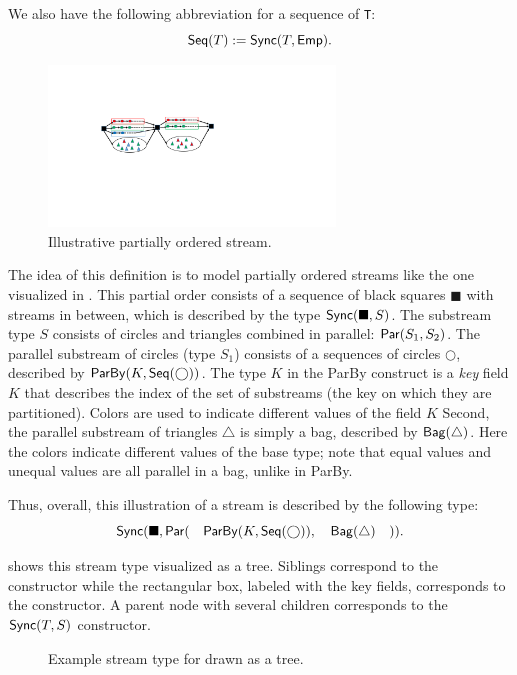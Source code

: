 We also have the following abbreviation for a sequence of \texttt{T}:
\[
  \mathsf{Seq}({T}) := \mathsf{Sync}({T}, \mathsf{Emp}{}).
\]

\begin{figure}
  \centering
  \includegraphics[width=3in]{figures/synchschemas/SPS2.pdf}
  \caption{Illustrative partially ordered stream.}
  \label{fig:ex-postream}
\end{figure}

The idea of this definition is to model partially ordered streams like the one visualized in .
This partial order consists of a sequence of black squares $\blacksquare$ with streams in between, which is described by the type $\mathsf{Sync}({\blacksquare}, S)$.
The substream type $S$ consists of circles and triangles combined in parallel: $\mathsf{Par}({S_1}, {S_2})$.
The parallel substream of circles (type $S_1$) consists of a sequences of circles $\bigcirc$, described by $\mathsf{ParBy}({K}, \mathsf{Seq}({\bigcirc}))$.
The type $K$ in the ParBy construct is a \emph{key} field $K$ that describes the index of the set of substreams (the key on which they are partitioned).
Colors are used to indicate different values of the field $K$
Second, the parallel substream of triangles $\triangle$ is simply a bag, described by $\mathsf{Bag}({\triangle})$.
Here the colors indicate different values of the base type; note that equal values and unequal values are all parallel in a bag, unlike in ParBy.

Thus, overall, this illustration of a stream is described by the following type:
\[
\mathsf{Sync}({\blacksquare}, \mathsf{Par}({ \quad \mathsf{ParBy}({K}, \mathsf{Seq}({\bigcirc}))}, {\quad \mathsf{Bag}({\triangle}) \quad})).
\]

 shows this stream type visualized as a tree.
Siblings correspond to the  constructor while the rectangular box,
labeled with the key fields, corresponds to the  constructor.
A parent node with several children corresponds to the $\mathsf{Sync}({T}, S)$ constructor.

\begin{figure}[t]
  \centering
  \caption{Example stream type for  drawn as a tree.}
  \label{45:fig:example-schema}
\end{figure}


